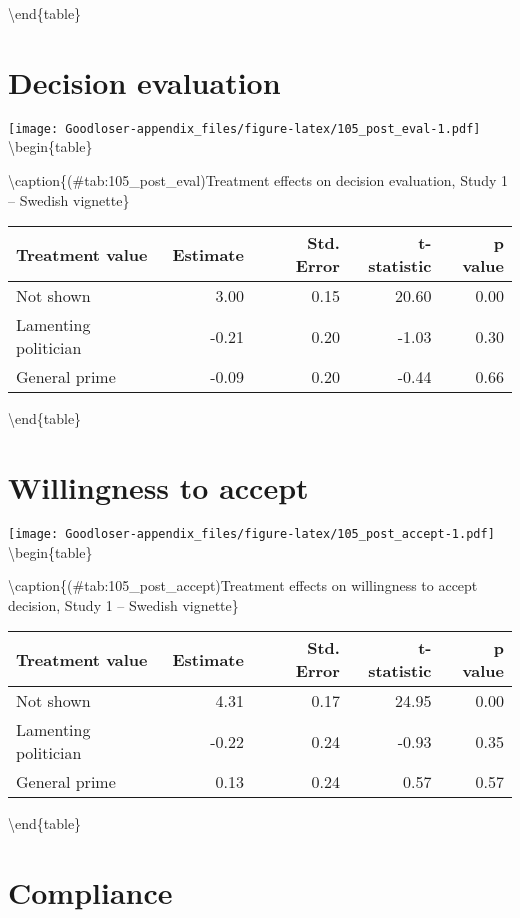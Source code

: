\documentclass[
]{book}
\begin{document}
\textbackslash end\{table\}

\hypertarget{decision-evaluation-1}{%
\section{Decision evaluation}\label{decision-evaluation-1}}

\texttt{[image: Goodloser-appendix\_files/figure-latex/105\_post\_eval-1.pdf]} \textbackslash begin\{table\}

\textbackslash caption\{(\#tab:105\_post\_eval)Treatment effects on decision evaluation, Study 1 -- Swedish vignette\}
\centering

\begin{tabular}[t]{lrrrr}
\toprule
Treatment value & Estimate & Std. Error & t-statistic & p value\\
\midrule
Not shown & 3.00 & 0.15 & 20.60 & 0.00\\
Lamenting politician & -0.21 & 0.20 & -1.03 & 0.30\\
General prime & -0.09 & 0.20 & -0.44 & 0.66\\
\bottomrule
\end{tabular}

\textbackslash end\{table\}

\hypertarget{willingness-to-accept-1}{%
\section{Willingness to accept}\label{willingness-to-accept-1}}

\texttt{[image: Goodloser-appendix\_files/figure-latex/105\_post\_accept-1.pdf]} \textbackslash begin\{table\}

\textbackslash caption\{(\#tab:105\_post\_accept)Treatment effects on willingness to accept decision, Study 1 -- Swedish vignette\}
\centering

\begin{tabular}[t]{lrrrr}
\toprule
Treatment value & Estimate & Std. Error & t-statistic & p value\\
\midrule
Not shown & 4.31 & 0.17 & 24.95 & 0.00\\
Lamenting politician & -0.22 & 0.24 & -0.93 & 0.35\\
General prime & 0.13 & 0.24 & 0.57 & 0.57\\
\bottomrule
\end{tabular}

\textbackslash end\{table\}

\hypertarget{compliance-1}{%
\section{Compliance}\label{compliance-1}}
\end{document}
